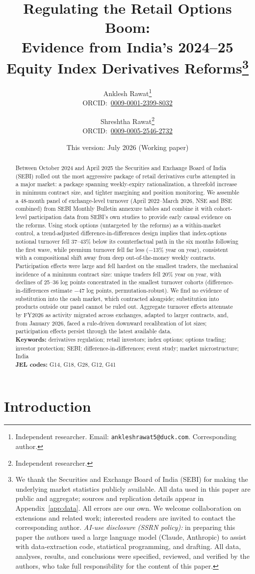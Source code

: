 \documentclass[12pt]{article}
\title{\textbf{Regulating the Retail Options Boom:\\
Evidence from India's 2024--25 Equity Index Derivatives Reforms}\thanks{%
We thank the Securities and Exchange Board of India (SEBI) for making the
underlying market statistics publicly available. All data used in this paper
are public and aggregate; sources and replication details appear in
Appendix~\ref{app:data}. All errors are our own. We welcome collaboration on
extensions and related work; interested readers are invited to contact the
corresponding author.
\emph{AI-use disclosure (SSRN policy):} in preparing this paper the authors
used a large language model (Claude, Anthropic) to assist with data-extraction
code, statistical programming, and drafting. All data, analyses, results, and
conclusions were specified, reviewed, and verified by the authors, who take
full responsibility for the content of this paper.}}
\author{Anklesh Rawat\thanks{Independent researcher. Email:
\texttt{ankleshrawat5@duck.com}. Corresponding author.}\\[2pt]
{\small ORCID:~\href{https://orcid.org/0009-0001-2399-8032}{0009-0001-2399-8032}}
\and Shreshtha Rawat\thanks{Independent researcher.}\\[2pt]
{\small ORCID:~\href{https://orcid.org/0009-0005-2546-2732}{0009-0005-2546-2732}}}
\date{This version: July 2026 (Working paper)}
\begin{document}
\maketitle

\begin{abstract}
\noindent Between October 2024 and April 2025 the Securities and Exchange
Board of India (SEBI) rolled out the most aggressive package of retail
derivatives curbs attempted in a major market: a package spanning
weekly-expiry rationalization, a threefold increase in minimum contract
size, and tighter margining and position monitoring. We assemble a 48-month panel of exchange-level turnover
(April 2022--March 2026, NSE and BSE combined) from SEBI Monthly Bulletin
annexure tables and combine it with cohort-level participation data from
SEBI's own studies to provide early causal evidence on the reforms. Using
stock options (untargeted by the reforms) as a within-market control, a
trend-adjusted difference-in-differences design implies that index-options
notional turnover fell 37--43\% below its counterfactual path in the six
months following the first wave, while premium turnover fell far less
(\(-\)13\% year on year), consistent with a compositional shift away from
deep out-of-the-money weekly contracts. Participation effects were large and
fell hardest on the smallest traders, the mechanical incidence of a minimum
contract size: unique traders fell 20\% year on year, with declines of
25--36 log points concentrated in the smallest turnover cohorts
(difference-in-differences estimate \(-\)47 log points, permutation-robust).
We find no evidence of substitution into the cash market, which contracted
alongside; substitution into products outside our panel cannot be ruled out.
Aggregate turnover effects attenuate by FY2026 as activity migrated across
exchanges, adapted to larger contracts, and, from January 2026, faced a
rule-driven downward recalibration of lot sizes; participation effects
persist through the latest available data.\\[6pt]
\textbf{Keywords:} derivatives regulation; retail investors; index options;
options trading; investor protection; SEBI; difference-in-differences;
event study; market microstructure; India\\
\textbf{JEL codes:} G14, G18, G28, G12, G41
\end{abstract}

\newpage

\section{Introduction}\label{sec:intro}
\end{document}
